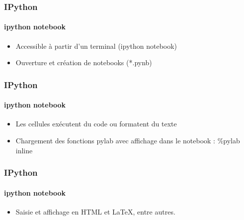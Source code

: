 \begin{frame}[fragile]
\frametitle{IPython}
\framesubtitle{ipython notebook}
\begin{itemize}
 \item Accessible à partir d'un terminal (ipython notebook) 
 \item Ouverture et création de notebooks (*.pynb)
\end{itemize}
\begin{center}
\end{center}
\end{frame}
\begin{frame}[fragile]
\frametitle{IPython}
\framesubtitle{ipython notebook}
\begin{itemize}
 \item Les cellules exécutent du code ou formatent du texte
 \item Chargement des fonctions pylab avec affichage dans le notebook : \%pylab inline 
\end{itemize}
\begin{center}
\end{center}
\end{frame}
\begin{frame}[fragile]
\frametitle{IPython}
\framesubtitle{ipython notebook}
\begin{itemize}
 \item Saisie et affichage en HTML et LaTeX, entre autres.   
\end{itemize}
\begin{center}
\end{center}
\end{frame}
